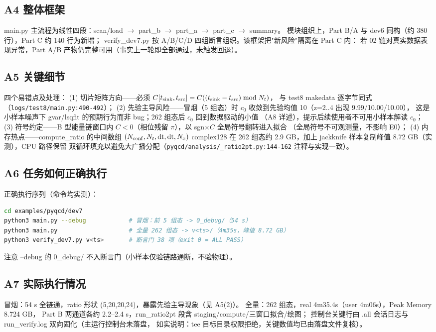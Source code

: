 \documentclass[UTF8]{ctexart}
\begin{document}
\subsection{A4 整体框架}
main.py 主流程为线性四段：scan/load $\to$ part\_b $\to$ part\_a $\to$ part\_c $\to$ summary。
模块组织上，Part B/A 与 dev6 同构（约 380 行），Part C 约 140 行为新增；
verify\_dev7.py 按 A/B/C/D 四组断言组织。该框架把"新风险"隔离在 Part C 内：
若 02 链对真实数据表现异常，Part A/B 产物仍完整可用（事实上一轮即全部通过，未触发回退）。

\subsection{A5 关键细节}
四个易错点及处理：
(1) 切片矩阵方向——必须 $C[t_{\rm sink},t_{\rm src}]=C((t_{\rm sink}-t_{\rm src})\bmod N_t)$，
与 test8 makedata 逐字节同式（\texttt{\nolinkurl{logs/test8/main.py:490-492}}）；
(2) 先验主导风险——冒烟（5 组态）时 $c_0$ 收敛到先验均值 10（z=2..4 出现 9.99/10.00/10.00），
这是小样本噪声下 gvar/lsqfit 的预期行为而非 bug；262 组态后 $c_0$ 回到数据驱动的小值
（A8 详述），提示后续使用者不可用小样本解读 $c_0$；
(3) 符号约定——B 型能量链窗口内 $C<0$（相位残留 $\pi$），以 sgn$\times C$ 全局符号翻转进入拟合
（全局符号不可观测量，不影响 E0）；
(4) 内存热点——compute\_ratio 的中间数组 $(N_{\rm conf},N_t,\mathrm{dt},\mathrm{dt},N_x)$
complex128 在 262 组态约 2.9 GB，加上 jackknife 样本复制峰值 8.72 GB（实测），CPU 路径保留
双循环填充以避免大广播分配（\texttt{\nolinkurl{pyqcd/analysis/\_ratio2pt.py:144-162}} 注释与实现一致）。

\subsection{A6 任务如何正确执行}
正确执行序列（命令均实测）：
\begin{lstlisting}[language=bash]
cd examples/pyqcd/dev7
python3 main.py --debug            # 冒烟：前 5 组态 -> 0_debug/（54 s）
python3 main.py                    # 全量 262 组态 -> v<ts>/（4m35s，峰值 8.72 GB）
python3 verify_dev7.py v<ts>       # 断言门 38 项（exit 0 = ALL PASS）
\end{lstlisting}
注意 --debug 的 0\_debug/ 不入断言门（小样本仅验链路通断，不验物理）。

\subsection{A7 实际执行情况}
冒烟：54 s 全链通，ratio 形状 (5,20,20,24)，暴露先验主导现象（见 A5(2)）。
全量：262 组态，real 4m35.4s（user 4m06s），Peak Memory 8.724 GB，
Part B 两通道各约 2.2--2.4 s，run\_ratio2pt 段含 staging/compute/三窗口拟合/绘图；
控制台关键行由 .all 会话日志与 run\_verify.log 双向固化（主运行控制台未落盘，
如实说明：tee 目标目录权限拒绝，关键数值均已由落盘文件复核）。
\end{document}
